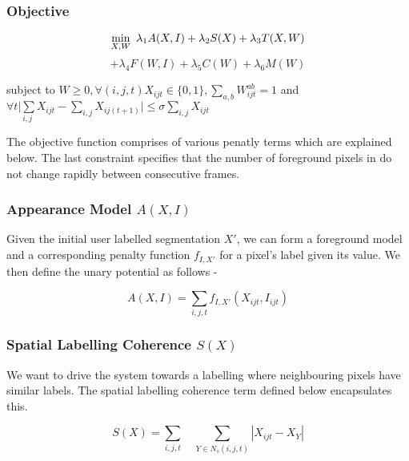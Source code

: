 \subsubsection*{Objective}

\begin{equation}
\underset{X,W}{\min}\enskip\lambda_{1}A(X,I)+\lambda_{2}S(X)+\lambda_{3}T(X,W)
\end{equation}
\[
+\lambda_{4}F(W,I) +\lambda_{5}C(W)+\lambda_{6}M(W)
\]


\begin{center}
subject to $W\geq0,\forall(i,j,t)X_{ijt}\in\{0,1\},\underset{a,b}{\sum}W_{ijt}^{ab}=1$
and $\forall t\underset{i,j}{|\sum}X_{ijt}-\underset{i,j}{\sum}X_{ij(t+1)}|\leq\sigma\underset{i,j}{\sum}X_{ijt}$
\par\end{center}

\noindent The objective function comprises of various penatly terms
which are explained below. The last constraint specifies that the
number of foreground pixels in do not change rapidly between consecutive
frames.


\subsubsection*{Appearance Model $A(X,I)$}

Given the initial user labelled segmentation $X'$, we can form a
foreground model and a corresponding penalty function $f_{I,X'}$
for a pixel's label given its value. We then define the unary potential
as follows -

\begin{equation}
A(X,I)=\underset{i,j,t}{\sum}f_{I,X'}(X_{ijt},I_{ijt})
\end{equation}



\subsubsection*{Spatial Labelling Coherence $S(X)$}

We want to drive the system towards a labelling where neighbouring
pixels have similar labels. The spatial labelling coherence term defined
below encapsulates this.

\begin{equation}
S(X)=\underset{i,j,t}{\sum}\quad\underset{Y\in N_{s}(i,j,t)}{\sum}|X_{ijt}-X_{Y}|
\end{equation}



